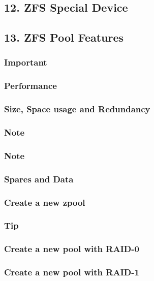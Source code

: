 \subsection{12. ZFS Special Device}

\subsection{13. ZFS Pool Features}

\subsubsection{Important}

\subsubsection{Performance}

\subsubsection{Size, Space usage and Redundancy}

\subsubsection{Note}

\subsubsection{Note}

\subsubsection{Spares and Data}

\subsubsection{Create a new zpool}

\subsubsection{Tip}

\subsubsection{Create a new pool with RAID-0}

\subsubsection{Create a new pool with RAID-1}

